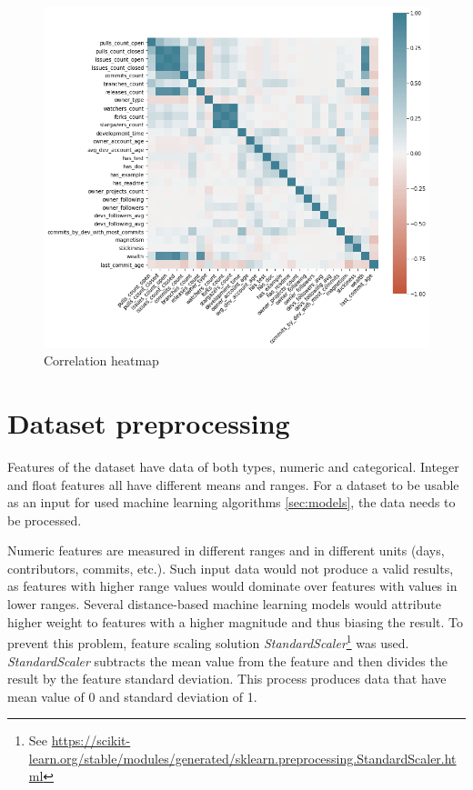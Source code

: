 \begin{figure}
    \centering
    \includegraphics[scale=0.5]{chapters/chapter3/corr-heatmap.png}
    \caption{Correlation heatmap}
    \label{fig:heatmap}
\end{figure}


\section{Dataset preprocessing}

Features of the dataset have data of both types, numeric and categorical.
Integer and float features all have different means and ranges.
For a dataset to be usable as an input for used machine learning algorithms \ref{sec:models}, the data needs to be processed.

Numeric features are measured in different ranges and in different units (days, contributors, commits, etc.).
Such input data would not produce a valid results, as features with higher range values would dominate over features with values in lower ranges.
Several distance-based machine learning models would attribute higher weight to features with a higher magnitude and thus biasing the result.
To prevent this problem, feature scaling solution \emph{StandardScaler}\footnote{See \url{https://scikit-learn.org/stable/modules/generated/sklearn.preprocessing.StandardScaler.html}} was used.
\emph{StandardScaler} subtracts the mean value from the feature and then divides the result by the feature standard deviation.
This process produces data that have mean value of 0 and standard deviation of 1.

